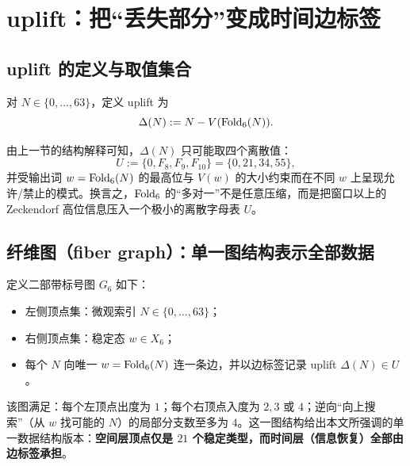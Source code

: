 
\section{uplift：把“丢失部分”变成时间边标签}

\subsection{uplift 的定义与取值集合}

\begin{definition}
对 $N\in\{0,\dots,63\}$，定义 uplift 为
$$
\Delta(N):=N - V(\mathrm{Fold}_6(N)).
$$
\end{definition}

由上一节的结构解释可知，$\Delta(N)$ 只可能取四个离散值：
$$
U:=\{0,F_8,F_9,F_{10}\}=\{0,21,34,55\},
$$
并受输出词 $w=\mathrm{Fold}_6(N)$ 的最高位与 $V(w)$ 的大小约束而在不同 $w$ 上呈现允许/禁止的模式。换言之，$\mathrm{Fold}_6$ 的“多对一”不是任意压缩，而是把窗口以上的 Zeckendorf 高位信息压入一个极小的离散字母表 $U$。

\subsection{纤维图（fiber graph）：单一图结构表示全部数据}

\begin{definition}[二部带标号纤维图 $G_6$]
定义二部带标号图 $G_6$ 如下：
\begin{itemize}
  \item 左侧顶点集：微观索引 $N\in\{0,\dots,63\}$；
  \item 右侧顶点集：稳定态 $w\in X_6$；
  \item 每个 $N$ 向唯一 $w=\mathrm{Fold}_6(N)$ 连一条边，并以边标签记录 uplift $\Delta(N)\in U$。
\end{itemize}
\end{definition}

该图满足：每个左顶点出度为 $1$；每个右顶点入度为 $2,3$ 或 $4$；逆向“向上搜索”（从 $w$ 找可能的 $N$）的局部分支数至多为 $4$。这一图结构给出本文所强调的单一数据结构版本：\textbf{空间层顶点仅是 $21$ 个稳定类型，而时间层（信息恢复）全部由边标签承担}。

